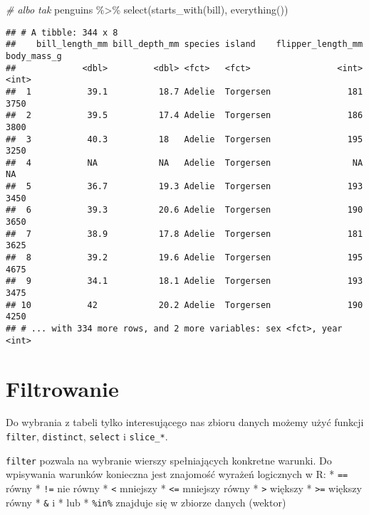 \documentclass[
]{book}
\newenvironment{Shaded}{\begin{snugshade}}{\end{snugshade}}
\newcommand{\CommentTok}[1]{\textcolor[rgb]{0.56,0.35,0.01}{\textit{#1}}}
\newcommand{\FunctionTok}[1]{\textcolor[rgb]{0.00,0.00,0.00}{#1}}
\newcommand{\NormalTok}[1]{#1}
\newcommand{\SpecialCharTok}[1]{\textcolor[rgb]{0.00,0.00,0.00}{#1}}
\newcommand{\StringTok}[1]{\textcolor[rgb]{0.31,0.60,0.02}{#1}}
\begin{document}
\begin{Shaded}
\begin{Highlighting}[]
\CommentTok{\# albo tak}
\NormalTok{penguins }\SpecialCharTok{\%\textgreater{}\%} \FunctionTok{select}\NormalTok{(}\FunctionTok{starts\_with}\NormalTok{(}\StringTok{\textquotesingle{}bill\textquotesingle{}}\NormalTok{), }\FunctionTok{everything}\NormalTok{())}
\end{Highlighting}
\end{Shaded}

\begin{verbatim}
## # A tibble: 344 x 8
##    bill_length_mm bill_depth_mm species island    flipper_length_mm body_mass_g
##             <dbl>         <dbl> <fct>   <fct>                 <int>       <int>
##  1           39.1          18.7 Adelie  Torgersen               181        3750
##  2           39.5          17.4 Adelie  Torgersen               186        3800
##  3           40.3          18   Adelie  Torgersen               195        3250
##  4           NA            NA   Adelie  Torgersen                NA          NA
##  5           36.7          19.3 Adelie  Torgersen               193        3450
##  6           39.3          20.6 Adelie  Torgersen               190        3650
##  7           38.9          17.8 Adelie  Torgersen               181        3625
##  8           39.2          19.6 Adelie  Torgersen               195        4675
##  9           34.1          18.1 Adelie  Torgersen               193        3475
## 10           42            20.2 Adelie  Torgersen               190        4250
## # ... with 334 more rows, and 2 more variables: sex <fct>, year <int>
\end{verbatim}

\hypertarget{filtrowanie}{%
\section{Filtrowanie}\label{filtrowanie}}

Do wybrania z tabeli tylko interesującego nas zbioru danych możemy użyć funkcji \texttt{filter}, \texttt{distinct}, \texttt{select} i \texttt{slice\_*}.

\texttt{filter} pozwala na wybranie wierszy spełniających konkretne warunki. Do wpisywania warunków konieczna jest znajomość wyrażeń logicznych w R:
* \texttt{==} równy
* \texttt{!=} nie równy
* \texttt{\textless{}} mniejszy
* \texttt{\textless{}=} mniejszy równy
* \texttt{\textgreater{}} większy
* \texttt{\textgreater{}=} większy równy
* \texttt{\&} i
* \texttt{\textbar{}} lub
* \texttt{\%in\%} znajduje się w zbiorze danych (wektor)
\end{document}
